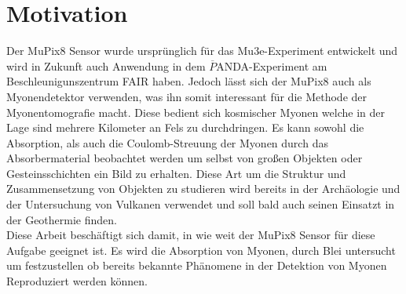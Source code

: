 \section{Motivation}
Der MuPix8 Sensor wurde ursprünglich für das Mu3e-Experiment entwickelt und wird in Zukunft auch Anwendung in dem $\overline{P}$ANDA-Experiment am Beschleunigunszentrum FAIR haben. 
Jedoch lässt sich der MuPix8 auch als Myonendetektor verwenden, was ihn somit interessant für die Methode der Myonentomografie macht. 
Diese bedient sich kosmischer Myonen welche in der Lage sind mehrere Kilometer an Fels zu durchdringen. 
Es kann sowohl die Absorption, als auch die Coulomb-Streuung der Myonen durch das Absorbermaterial beobachtet werden um selbst von großen Objekten oder Gesteinsschichten ein Bild zu erhalten. 
Diese Art um die Struktur und Zusammensetzung von Objekten zu studieren wird bereits in der Archäologie und der Untersuchung von Vulkanen verwendet und soll bald auch seinen Einsatzt in der Geothermie finden. \\
\newline
Diese Arbeit beschäftigt sich damit, in wie weit der MuPix8 Sensor für diese Aufgabe geeignet ist. 
Es wird die Absorption von Myonen, durch Blei untersucht um festzustellen ob bereits bekannte Phänomene in der  Detektion von Myonen Reproduziert werden können. 

